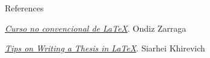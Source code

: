 \begin{frame}{References}
 \begin{fullpageitemize}
	\itemR\href{https://ondiz.github.io/cursoLatex/}{\emph{Curso no convencional de LaTeX}}. Ondiz Zarraga

	\itemR \href{http://www.khirevich.com/latex/}{\emph{Tips on Writing a Thesis in LaTeX}}. Siarhei Khirevich
 \end{fullpageitemize}
\end{frame}


